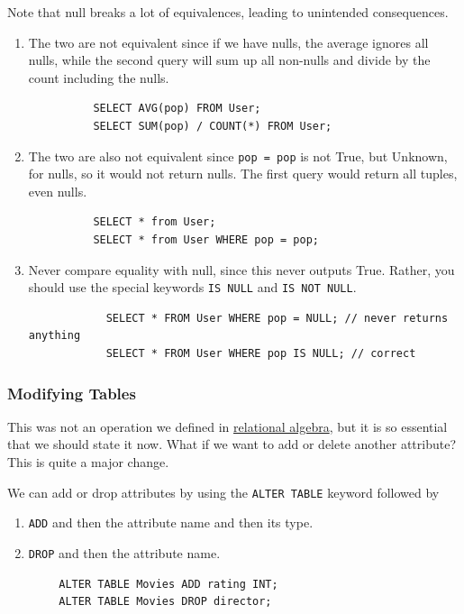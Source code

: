     \begin{example}[Warnings]
      \label{ex:warnings}
      Note that null breaks a lot of equivalences, leading to unintended consequences. 
      \begin{enumerate}
        \item The two are not equivalent since if we have nulls, the average ignores all nulls, while the second query will sum up all non-nulls and divide by the count including the nulls. 
        \begin{lstlisting}
          SELECT AVG(pop) FROM User; 
          SELECT SUM(pop) / COUNT(*) FROM User; 
        \end{lstlisting}

        \item The two are also not equivalent since \texttt{pop = pop} is not True, but Unknown, for nulls, so it would not return nulls. The first query would return all tuples, even nulls. 
        \begin{lstlisting}
          SELECT * from User; 
          SELECT * from User WHERE pop = pop; 
        \end{lstlisting}

        \item Never compare equality with null, since this never outputs True. Rather, you should use the special keywords \texttt{IS NULL} and \texttt{IS NOT NULL}. 
          \begin{lstlisting}
            SELECT * FROM User WHERE pop = NULL; // never returns anything 
            SELECT * FROM User WHERE pop IS NULL; // correct 
          \end{lstlisting}
      \end{enumerate}
    \end{example}

  \subsubsection{Modifying Tables}

    This was not an operation we defined in \hyperref[def:relational-algebra]{relational algebra}, but it is so essential that we should state it now. What if we want to add or delete another attribute? This is quite a major change. 

    \begin{theorem}
      \label{thm:alter-table}
      We can add or drop attributes by using the \texttt{ALTER TABLE} keyword followed by 
      \begin{enumerate}
        \item \texttt{ADD} and then the attribute name and then its type. 
        \item \texttt{DROP} and then the attribute name. 
      \end{enumerate}
      \begin{lstlisting}
        ALTER TABLE Movies ADD rating INT; 
        ALTER TABLE Movies DROP director; 
      \end{lstlisting}
    \end{theorem} 

